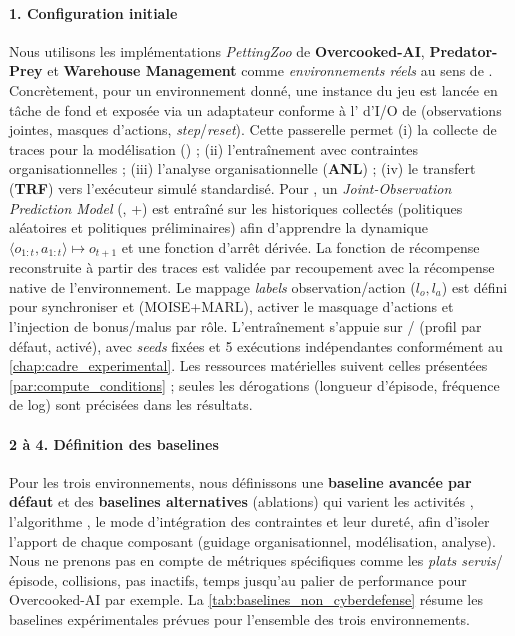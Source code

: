 \paragraph{1. Configuration initiale}

Nous utilisons les implémentations \emph{PettingZoo} de \phantom{X} \textbf{Overcooked-AI}, \textbf{Predator-Prey} et \textbf{Warehouse Management} comme \emph{environnements réels} au sens de . Concrètement, pour un environnement donné, une instance du jeu est lancée en tâche de fond et exposée via un adaptateur  conforme à l' d'I/O de  (observations jointes, masques d'actions, \emph{step}/\emph{reset}). Cette passerelle permet (i) la collecte de traces pour la modélisation () ; (ii) l'entraînement  avec contraintes organisationnelles ; (iii) l'analyse organisationnelle (\textbf{ANL}) ; (iv) le transfert (\textbf{TRF}) vers l'exécuteur simulé standardisé.
Pour , un \emph{Joint-Observation Prediction Model} (, +) est entraîné sur les historiques collectés (politiques aléatoires et politiques préliminaires) afin d'apprendre la dynamique $\langle o_{1:t},a_{1:t} \rangle \mapsto o_{t+1}$ et une fonction d'arrêt dérivée. La fonction de récompense reconstruite à partir des traces est validée par recoupement avec la récompense native de l'environnement. Le mappage \emph{labels} observation/action ($l_o, l_a$) est défini pour synchroniser  et  (MOISE+MARL), activer le masquage d'actions et l'injection de bonus/malus par rôle. L'entraînement s'appuie sur / (profil  par défaut,  activé), avec \textit{seeds} fixées et 5 exécutions indépendantes conformément au \autoref{chap:cadre_experimental}. Les ressources matérielles suivent celles présentées \autoref{par:compute_conditions} ; seules les dérogations (longueur d'épisode, fréquence de log) sont précisées dans les résultats.

\paragraph{2 à 4. Définition des baselines}

Pour les trois environnements, nous définissons une \textbf{baseline avancée par défaut} et des \textbf{baselines alternatives} (ablations) qui varient les activités , l'algorithme , le mode d'intégration des contraintes et leur dureté, afin d'isoler l'apport de chaque composant (guidage organisationnel, modélisation, analyse). Nous ne prenons pas en compte de métriques spécifiques comme les \emph{plats servis}/épisode, collisions, pas inactifs, temps jusqu'au palier de performance pour Overcooked-AI par exemple. La \autoref{tab:baselines_non_cyberdefense} résume les baselines expérimentales prévues pour l'ensemble des trois environnements.


